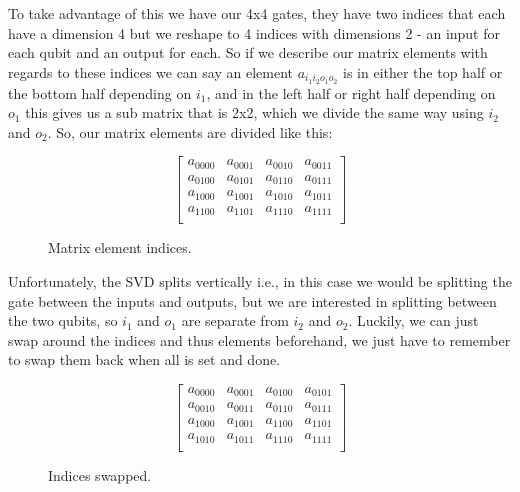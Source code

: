 \vspace{\baselineskip}
\noindent
To take advantage of this we have our 4x4 gates, they have two indices that each have a dimension 4 but we reshape to 4 indices with dimensions 2 - an input for each qubit and an output for each. So if we describe our matrix elements with regards to these indices we can say an element $a_{i_1i_2o_1o_2}$ is in either the top half or the bottom half depending on $i_1$, and in the left half or right half depending on $o_1$ this gives us a sub matrix that is 2x2, which we divide the same way using $i_2$ and $o_2$. So, our matrix elements are divided like this: 
\begin{figure}[H]
    $$
    \begin{bmatrix}
        a_{0000} & a_{0001} & a_{0010} & a_{0011}\\
        a_{0100} & a_{0101} & a_{0110} & a_{0111}\\
        a_{1000} & a_{1001} & a_{1010} & a_{1011}\\
        a_{1100} & a_{1101} & a_{1110} & a_{1111}\\
    \end{bmatrix}
    $$
    \caption{Matrix element indices.}
    \label{fig:matrix_indices}
\end{figure}
\noindent
Unfortunately, the SVD splits vertically i.e., in this case we would be splitting the gate between the inputs and outputs, but we are interested in splitting between the two qubits, so $i_1$ and $o_1$ are separate from $i_2$ and $o_2$. Luckily, we can just swap around the indices and thus elements beforehand, we just have to remember to swap them back when all is set and done.
\begin{figure}[H]
    $$
    \begin{bmatrix}
        a_{0000} & a_{0001} & a_{0100} & a_{0101}\\
        a_{0010} & a_{0011} & a_{0110} & a_{0111}\\
        a_{1000} & a_{1001} & a_{1100} & a_{1101}\\
        a_{1010} & a_{1011} & a_{1110} & a_{1111}\\
    \end{bmatrix}
    $$
    \caption{Indices swapped.}
    \label{fig:matrix_swapped}
\end{figure}

